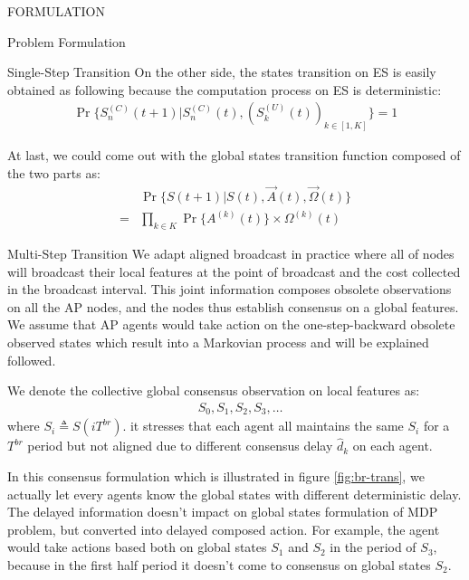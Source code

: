 \documentclass[10pt, conference, letterpaper]{IEEEtran}
\begin{document}
\begin{section}{FORMULATION}
\begin{subsection}{Problem Formulation}
\begin{subsubsection}{Single-Step Transition}
                On the other side, the states transition on ES is easily obtained as following because the computation process on ES is deterministic:
                \begin{align}
                    \Pr\{ S_{n}^{(C)}(t+1) |S_{n}^{(C)}(t), (S_{k}^{(U)}(t))_{k \in [1,K]} \} = 1
                \end{align}

                At last, we could come out with the global states transition function composed of the two parts as:
                \begin{align}
                    & \Pr\{ S(t+1)|S(t), \vec{A}(t), \vec{\Omega}(t)  \}
                    \nonumber\\
                    = & \prod_{k \in K} \Pr\{ A^{(k)}(t) \} \times \Omega^{(k)}(t)
                \end{align}
            \end{subsubsection}

            \begin{subsubsection}{Multi-Step Transition}
                We adapt aligned broadcast in practice where all of nodes will broadcast their local features at the point of broadcast and the cost collected in the broadcast interval.
                This joint information composes obsolete observations on all the AP nodes, and the nodes thus establish consensus on a global features. We assume that AP agents would take action on the one-step-backward obsolete observed states which result into a Markovian process and will be explained followed.

                We denote the collective global consensus observation on local features as:
                \begin{align*}
                    & S_0, S_1, S_2, S_3, \dots
                \end{align*}
                where $S_i \triangleq S(iT^{br})$. it stresses that each agent all maintains the same $S_i$ for a $T^{br}$ period but not aligned due to different consensus delay $\hat{d}_k$ on each agent.

                In this consensus formulation which is illustrated in figure \ref{fig:br-trans}, we actually let every agents know the global states with different deterministic delay. The delayed information doesn't impact on global states formulation of MDP problem, but converted into delayed composed action. For example, the agent would take actions based both on global states $S_1$ and $S_2$ in the period of $S_3$, because in the first half period it doesn't come to consensus on global states $S_2$.


\end{subsubsection}
\end{subsection}
\end{section}
\end{document}
